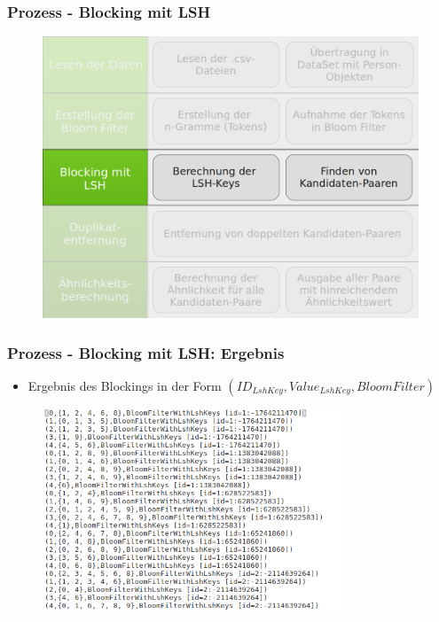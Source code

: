 \documentclass{beamer}
\begin{document}
    \begin{frame}
    		\frametitle{Prozess - Blocking mit LSH}
    		\begin{figure}[H]
    			\includegraphics[width=\textwidth]{graphics/process_3.png}
    		\end{figure}
    \end{frame}
    
    \begin{frame}
    		\frametitle{Prozess - Blocking mit LSH: Ergebnis}
    		\begin{itemize}
    			\item Ergebnis des Blockings in der Form $(ID_{LshKey}, Value_{LshKey},
    			 BloomFilter)$
    		\end{itemize}
    		\begin{figure}[H]
    			\includegraphics[width=0.8\textwidth]{graphics/lsh.png}
    		\end{figure}
    \end{frame}
    
\end{document}

